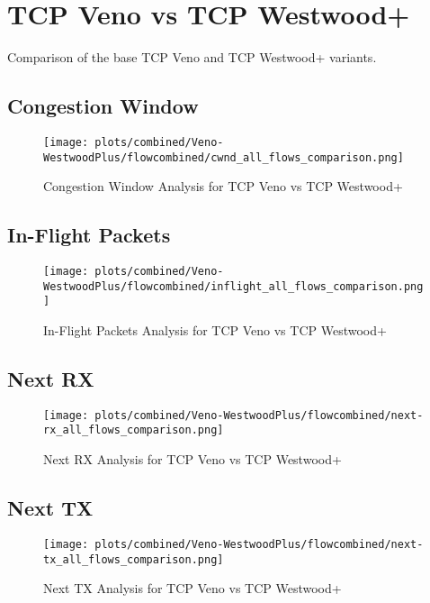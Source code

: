\documentclass[12pt,a4paper]{report}
\begin{document}
\section{TCP Veno vs TCP Westwood+}
\noindent Comparison of the base TCP Veno and TCP Westwood+ variants.


\newpage
\subsection{Congestion Window}
\begin{figure}[H]
\centering
\texttt{[image: plots/combined/Veno-WestwoodPlus/flowcombined/cwnd\_all\_flows\_comparison.png]}
\caption{Congestion Window Analysis for TCP Veno vs TCP Westwood+}
\label{fig:Veno-WestwoodPlus_cwnd}
\end{figure}

\newpage

\newpage
\subsection{In-Flight Packets}
\begin{figure}[H]
\centering
\texttt{[image: plots/combined/Veno-WestwoodPlus/flowcombined/inflight\_all\_flows\_comparison.png]}
\caption{In-Flight Packets Analysis for TCP Veno vs TCP Westwood+}
\label{fig:Veno-WestwoodPlus_inflight}
\end{figure}

\newpage

\newpage
\subsection{Next RX}
\begin{figure}[H]
\centering
\texttt{[image: plots/combined/Veno-WestwoodPlus/flowcombined/next-rx\_all\_flows\_comparison.png]}
\caption{Next RX Analysis for TCP Veno vs TCP Westwood+}
\label{fig:Veno-WestwoodPlus_next-rx}
\end{figure}

\newpage

\newpage
\subsection{Next TX}
\begin{figure}[H]
\centering
\texttt{[image: plots/combined/Veno-WestwoodPlus/flowcombined/next-tx\_all\_flows\_comparison.png]}
\caption{Next TX Analysis for TCP Veno vs TCP Westwood+}
\label{fig:Veno-WestwoodPlus_next-tx}
\end{figure}
\end{document}
